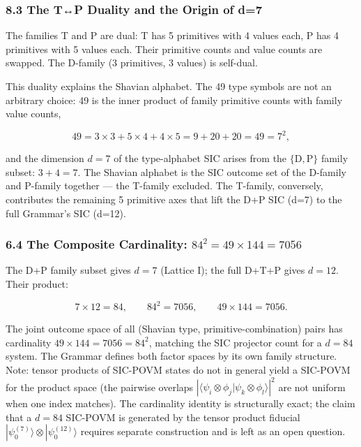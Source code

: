 \documentclass[12pt,a4paper]{article}
\begin{document}
\hypertarget{the-tp-duality-and-the-origin-of-d7}{%
\subsubsection{8.3 The T↔P Duality and the Origin of
d=7}\label{the-tp-duality-and-the-origin-of-d7}}

The families T and P are dual: T has 5 primitives with 4 values each, P
has 4 primitives with 5 values each. Their primitive counts and value
counts are swapped. The D-family (3 primitives, 3 values) is self-dual.

This duality explains the Shavian alphabet. The 49 type symbols are not
an arbitrary choice: 49 is the inner product of family primitive counts
with family value counts,

\[49 = 3 \times 3 + 5 \times 4 + 4 \times 5 = 9 + 20 + 20 = 49 = 7^2,\]

and the dimension \(d=7\) of the type-alphabet SIC arises from the
\(\{\mathrm{D,P}\}\) family subset: \(3 + 4 = 7\). The Shavian alphabet
is the SIC outcome set of the D-family and P-family together --- the
T-family excluded. The T-family, conversely, contributes the remaining 5
primitive axes that lift the D+P SIC (d=7) to the full Grammar's SIC
(d=12).

\hypertarget{the-composite-cardinality-842-49-times-144-7056}{%
\subsubsection{\texorpdfstring{6.4 The Composite Cardinality:
\(84^2 = 49 \times 144 = 7056\)}{6.4 The Composite Cardinality: 84\^{}2 = 49 \textbackslash times 144 = 7056}}\label{the-composite-cardinality-842-49-times-144-7056}}

The D+P family subset gives \(d=7\) (Lattice I); the full D+T+P gives
\(d=12\). Their product:

\[7 \times 12 = 84, \qquad 84^2 = 7056, \qquad 49 \times 144 = 7056.\]

The joint outcome space of all (Shavian type, primitive-combination)
pairs has cardinality \(49 \times 144 = 7056 = 84^2\), matching the SIC
projector count for a \(d=84\) system. The Grammar defines both factor
spaces by its own family structure. Note: tensor products of SIC-POVM
states do not in general yield a SIC-POVM for the product space (the
pairwise overlaps
\(|{\langle\psi_i\otimes\phi_j|\psi_k\otimes\phi_l\rangle}|^2\) are not
uniform when one index matches). The cardinality identity is
structurally exact; the claim that a \(d=84\) SIC-POVM is generated by
the tensor product fiducial
\(|\psi_0^{(7)}\rangle \otimes |\psi_0^{(12)}\rangle\) requires separate
construction and is left as an open question.
\end{document}
